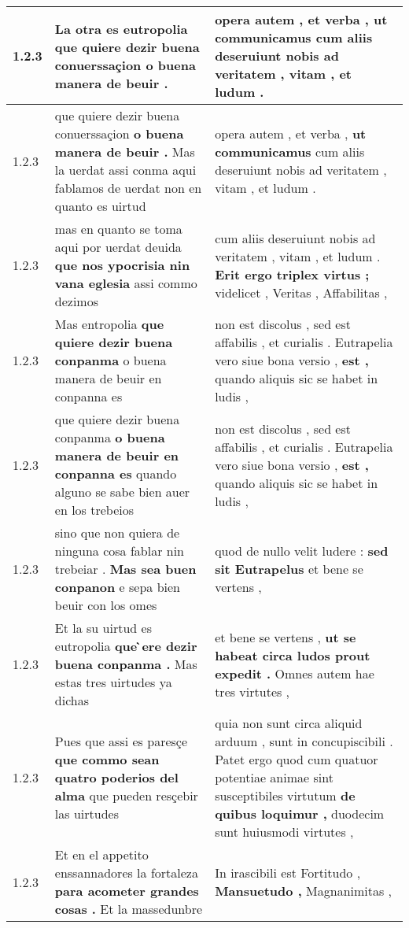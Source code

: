 \begin{tabular}{|p{1cm}|p{6.5cm}|p{6.5cm}|}
1.2.3 & La otra es eutropolia \textbf{ que quiere dezir buena conuerssaçion } o buena manera de beuir . & opera autem , et verba , \textbf{ ut communicamus } cum aliis deseruiunt nobis ad veritatem , vitam , et ludum . \\\hline
1.2.3 & que quiere dezir buena conuerssaçion \textbf{ o buena manera de beuir . } Mas la uerdat assi conma aqui fablamos de uerdat non en quanto es uirtud & opera autem , et verba , \textbf{ ut communicamus } cum aliis deseruiunt nobis ad veritatem , vitam , et ludum . \\\hline
1.2.3 & mas en quanto se toma aqui por uerdat deuida \textbf{ que nos ypocrisia nin vana eglesia } assi commo dezimos & cum aliis deseruiunt nobis ad veritatem , vitam , et ludum . \textbf{ Erit ergo triplex virtus ; } videlicet , Veritas , Affabilitas , \\\hline
1.2.3 & Mas entropolia \textbf{ que quiere dezir buena conpanma } o buena manera de beuir en conpanna es & non est discolus , sed est affabilis , et curialis . Eutrapelia vero siue bona versio , \textbf{ est , } quando aliquis sic se habet in ludis , \\\hline
1.2.3 & que quiere dezir buena conpanma \textbf{ o buena manera de beuir en conpanna es } quando alguno se sabe bien auer en los trebeios & non est discolus , sed est affabilis , et curialis . Eutrapelia vero siue bona versio , \textbf{ est , } quando aliquis sic se habet in ludis , \\\hline
1.2.3 & sino que non quiera de ninguna cosa fablar nin trebeiar . \textbf{ Mas sea buen conpanon } e sepa bien beuir con los omes & quod de nullo velit ludere : \textbf{ sed sit Eutrapelus } et bene se vertens , \\\hline
1.2.3 & Et la su uirtud es eutropolia \textbf{ que ̀ere dezir buena conpanma . } Mas estas tres uirtudes ya dichas & et bene se vertens , \textbf{ ut se habeat circa ludos prout expedit . } Omnes autem hae tres virtutes , \\\hline
1.2.3 & Pues que assi es paresçe \textbf{ que commo sean quatro poderios del alma } que pueden resçebir las uirtudes & quia non sunt circa aliquid arduum , sunt in concupiscibili . Patet ergo quod cum quatuor potentiae animae sint susceptibiles virtutum \textbf{ de quibus loquimur , } duodecim sunt huiusmodi virtutes , \\\hline
1.2.3 & Et en el appetito enssannadores la fortaleza \textbf{ para acometer grandes cosas . } Et la massedunbre & In irascibili est Fortitudo , \textbf{ Mansuetudo , } Magnanimitas , \\\hline

\end{tabular}
